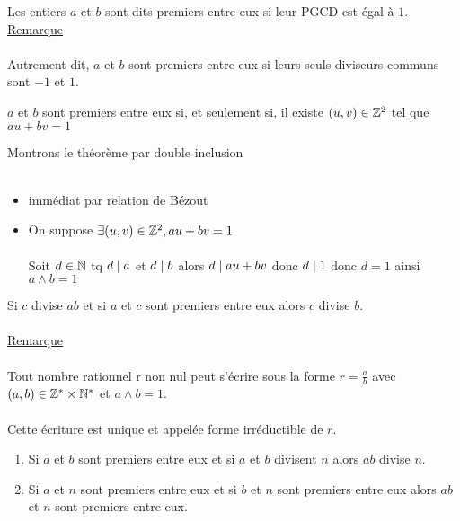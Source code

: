 \begin{defi}
    Les entiers \(a\) et \(b\) sont dits premiers entre eux si leur PGCD est égal à \(1\).
    \underline{Remarque}\\~\\
    Autrement dit, \(a\) et \(b\) sont premiers entre eux si leurs seuls diviseurs communs sont \(-1\) et \(1\).
\end{defi}

\begin{theo}
    \(a\) et \(b\) sont premiers entre eux si, et seulement si, il existe \((u, v) \in \mathbb{Z}^2\) tel que \(au + bv = 1\)
\end{theo}

\begin{dem}
    Montrons le théorème par double inclusion\\~\\
    \begin{itemize}
        \item \impdir immédiat par relation de Bézout
        \item \imprec On suppose \(\exists (u,v)\in \mathbb{Z}^2,au+bv = 1\)\\~\\
        Soit \(d \in \mathbb{N}\) tq \(d \mid a\) et \(d \mid b\) alors \(d\mid au+bv\) donc \(d \mid 1\) donc \(d=1\) ainsi \(a\wedge b = 1\)

    \end{itemize}
\end{dem}

\begin{theo}
    Si \(c\) divise \(ab\) et si \(a\) et \(c\) sont premiers entre eux alors \(c\) divise \(b\).\\~\\
    \underline{Remarque}\\~\\
        Tout nombre rationnel r non nul peut s’écrire sous la forme \(r = \frac{a}{b}\) avec \((a, b) \in \mathbb{Z}^* \times \mathbb{N}^* \) et \(a \wedge b = 1\).\\~\\
        Cette écriture est unique et appelée forme irréductible de \(r\).
\end{theo}

\begin{prop}
    \begin{enumerate}
        \item Si \(a\) et \(b\) sont premiers entre eux et si \(a\) et \(b\) divisent \(n\) alors \(ab\) divise \(n\).
        \item Si \(a\) et \(n\) sont premiers entre eux et si \(b\) et \(n\) sont premiers entre eux alors \(ab\) et \(n\) sont premiers
        entre eux.
    \end{enumerate}
\end{prop}


